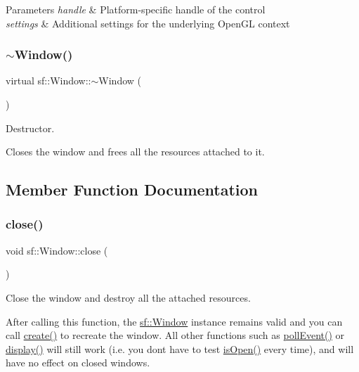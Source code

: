 \begin{DoxyParams}{Parameters}
{\em handle} & Platform-\/specific handle of the control \\
\hline
{\em settings} & Additional settings for the underlying Open\+GL context \\
\hline
\end{DoxyParams}
\mbox{\label{classsf_1_1_window_ac30eb6ea5f5594204944d09d4bd69a97}} 
\subsubsection{\texorpdfstring{$\sim$\+Window()}{~Window()}}
{\footnotesize\ttfamily virtual sf\+::\+Window\+::$\sim$\+Window (\begin{DoxyParamCaption}{ }\end{DoxyParamCaption})\hspace{0.3cm}{\ttfamily [virtual]}}



Destructor. 

Closes the window and frees all the resources attached to it. 

\subsection{Member Function Documentation}
\mbox{\label{classsf_1_1_window_a99d1e030387b0c26f5995670504fe7b5}} 
\subsubsection{\texorpdfstring{close()}{close()}}
{\footnotesize\ttfamily void sf\+::\+Window\+::close (\begin{DoxyParamCaption}{ }\end{DoxyParamCaption})}



Close the window and destroy all the attached resources. 

After calling this function, the \hyperlink{classsf_1_1_window}{sf\+::\+Window} instance remains valid and you can call \hyperlink{classsf_1_1_window_a30e6edf2162f8dbff61023b9de5d961d}{create()} to recreate the window. All other functions such as \hyperlink{classsf_1_1_window_a338e996585faf82e93069858e3b531b7}{poll\+Event()} or \hyperlink{classsf_1_1_window_adabf839cb103ac96cfc82f781638772a}{display()} will still work (i.\+e. you don\textquotesingle{}t have to test \hyperlink{classsf_1_1_window_ae873503db7d48157bb9cbf6129562bce}{is\+Open()} every time), and will have no effect on closed windows. \mbox{\label{classsf_1_1_window_a30e6edf2162f8dbff61023b9de5d961d}} 
